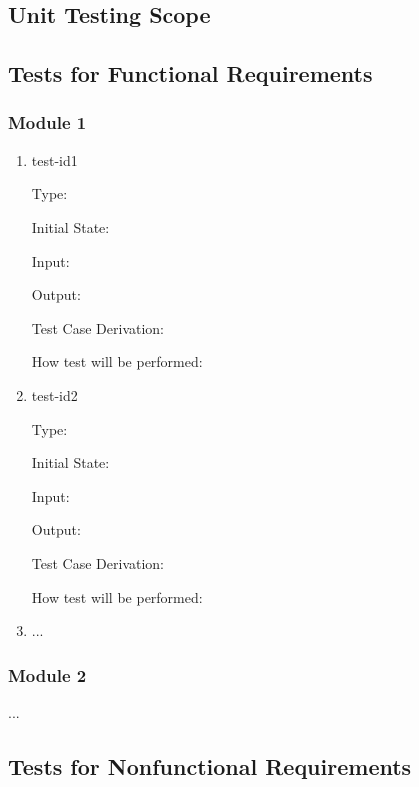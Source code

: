 \documentclass[12pt, titlepage]{article}
\begin{document}
\subsection{Unit Testing Scope}



\subsection{Tests for Functional Requirements}



\subsubsection{Module 1}


\begin{enumerate}

\item{test-id1\\}

Type: 

					
Initial State: 
					
Input: 
					
Output: 

Test Case Derivation: 

How test will be performed: 
					
\item{test-id2\\}

Type: 
					
Initial State: 
					
Input: 
					
Output: 

Test Case Derivation: 

How test will be performed: 

\item{...\\}
    
\end{enumerate}

\subsubsection{Module 2}

...

\subsection{Tests for Nonfunctional Requirements}
\end{document}
